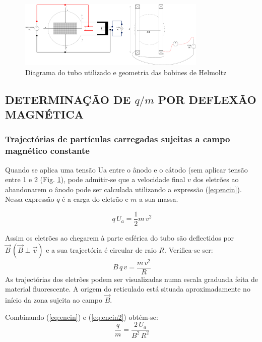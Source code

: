 \documentclass[a4paper,twoside,12pt]{article}      %
\begin{document}
\begin{figure}
	[!tb]  \centering 
	\includegraphics[width=0.8\textwidth]{TuboTL} 
	\caption{Diagrama do tubo utilizado e geometria das bobines de Helmoltz \label{fig:TL}} 
\end{figure}

\subsection{\sf DETERMINAÇÃO DE $q/m$ POR  DEFLEXÃO MAGNÉTICA}
\subsubsection{\sf Trajectórias de partículas carregadas sujeitas a campo magnético constante}
Quando se aplica uma tensão Ua entre o ânodo e o cátodo (sem aplicar tensão entre 1 e 2 (Fig. \ref{fig:TL}), pode admitir-se que a velocidade final $v$ dos eletrões ao abandonarem o ânodo pode ser calculada utilizando a expressão (\ref{eq:encin}). Nessa expressão  $q$  é a carga do eletrão e $m$ a sua massa.

\begin{equation}
	\label{eq:encin}
q\, U_a = \frac{1}{2} m \, v^2
\end{equation}

Assim os eletrões ao chegarem à parte esférica do tubo são deflectidos por $\vec{B}\,(\vec{B}\perp\vec{v})$ e a sua trajectória é circular de raio $R$. 
Verifica-se ser:
\begin{equation}
	\label{eq:encin2}
B \, q\, v = \frac{m\,v^2}{R} 
\end{equation}
As trajectórias dos eletrões podem ser visualizadas numa escala graduada feita de material fluorescente. 
A origem do reticulado está situada aproximadamente no início da zona 
sujeita ao campo $\vec{B}$.

Combinando (\ref{eq:encin}) e (\ref{eq:encin2}) obtém-se:
\begin{equation}
	\label{eq:encin3}
 \frac{q}{m} = \frac{2\, U_a}{B^2\,R^2} 
\end{equation}
\end{document}
